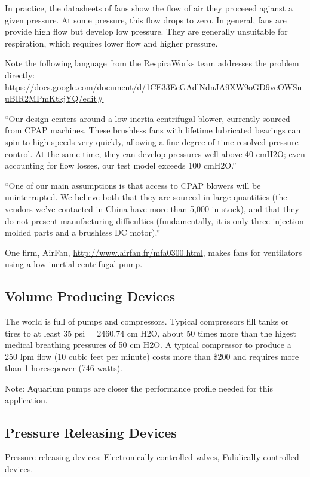 \documentclass{article}
\begin{document}
In practice, the datasheets of fans show the flow of air they proceeed agianst a given pressure. At some pressure,
this flow drops to zero. In general, fans are provide high flow but develop low pressure. They are generally unsuitable
for respiration, which requires lower flow and higher pressure.


Note the following language from the RespiraWorks team addresses the problem directly:
\url{https://docs.google.com/document/d/1CE33EcGAdlNdnJA9XW9oGD9veOWSuuBIR2MPmKtkjYQ/edit#}

``Our design centers around a low inertia centrifugal blower, currently sourced from CPAP machines. These brushless fans with lifetime lubricated bearings can spin to high speeds very quickly, allowing a fine degree of time-resolved pressure control. At the same time, they can develop pressures well above 40 cmH2O; even accounting for flow losses, our test model exceeds 100 cmH2O.''

``One of our main assumptions is that access to CPAP blowers will be uninterrupted. We believe both that they are sourced in large quantities (the vendors we’ve contacted in China have more than 5,000 in stock), and that they do not present manufacturing difficulties (fundamentally, it is only three injection molded parts and a brushless DC motor).''

One firm, AirFan, \url{http://www.airfan.fr/mfa0300.html}, makes fans for ventilators using a low-inertial centrifugal pump.

\subsection{Volume Producing Devices}

The world is full of pumps and compressors. Typical compressors fill tanks or tires to at least 35 psi = 2460.74 cm H2O,
about 50 times more than the higest medical breathing pressures of 50 cm H2O. A typical compressor to produce a 250 lpm
flow (10 cubic feet per minute) costs more than \$200 and requires more than 1 horesepower (746 watts).

Note: Aquarium pumps are closer the performance profile needed for this application.

\subsection{Pressure Releasing Devices}

\begin{outline}
  \1 Pressure releasing devices:
  \2 Electronically controlled valves,
  \2 Fulidically controlled devices.
\end{outline}
\end{document}
